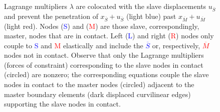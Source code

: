 \documentclass[11pt]{article}
\begin{document}
\begin{figure}
{Lagrange multipliers $\lambda$ are colocated with the slave displacements $u_{\overline S}$ and prevent the penetration of $x_{\overline S} + u_{\overline S}$ (light blue) past $x_{\overline M} + u_{\overline M}$ (light red).
Nodes ({\textcolor{blue}S}) and ({\textcolor{red}M}) are those slave, correspondingly, master, nodes that are in contact.
Left ({\textcolor{blue}L}) and right ({\textcolor{red} R}) nodes only couple to {\textcolor{blue}S} and {\textcolor{red}M} elastically and include the {\textcolor{blue}{$\overline S$}} or, respectively,
{\textcolor{red}{$\overline M$}} nodes not in contact.
Observe that only the Lagrange multipliers (forces of constraint) corresponding to the slave nodes in contact (circled) are nonzero; the corresponding equations couple the slave nodes in contact to the master nodes (circled) adjacent
to the master boundary elements (dark displaced curvilinear edges) supporting the slave nodes in contact.
\label{fig:contact}
}
\end{figure}
\end{document}
